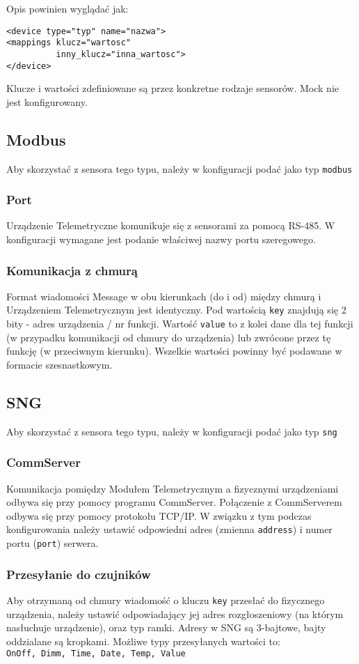 \documentclass[11pt]{article}
\begin{document}
Opis powinien wyglądać jak:
\begin{verbatim}
<device type="typ" name="nazwa">
<mappings klucz="wartosc"
          inny_klucz="inna_wartosc">
</device>
\end{verbatim}

Klucze i wartości zdefiniowane są przez konkretne rodzaje sensorów. Mock nie jest konfigurowany.


\subsection{Modbus}
Aby skorzystać z sensora tego typu, należy w konfiguracji podać jako typ \verb|modbus|
\subsubsection{Port}
Urządzenie Telemetryczne komunikuje się z sensorami za pomocą RS-485. W konfiguracji wymagane
jest podanie właściwej nazwy portu szeregowego.

\subsubsection{Komunikacja z chmurą}
Format wiadomości Message w obu kierunkach (do i od) między chmurą i Urządzeniem Telemetrycznym jest identyczny.
Pod wartością \verb|key| znajdują się 2 bity - adres urządzenia / nr funkcji. Wartość \verb|value| to z kolei dane
dla tej funkcji (w przypadku komunikacji od chmury do urządzenia) lub zwrócone przez tę funkcję (w przeciwnym kierunku).
Wszelkie wartości powinny być podawane w formacie szesnastkowym.


\subsection{SNG}
Aby skorzystać z sensora tego typu, należy w konfiguracji podać jako typ \verb|sng|
\subsubsection{CommServer}
Komunikacja pomiędzy Modułem Telemetrycznym a fizycznymi urządzeniami odbywa się przy pomocy
programu CommServer. Połączenie z CommServerem odbywa się przy pomocy protokołu TCP/IP.
W związku z tym podczas konfigurowania należy ustawić odpowiedni adres (zmienna \verb|address|)
i numer portu (\verb|port|) serwera.

\subsubsection{Przesyłanie do czujników}
Aby otrzymaną od chmury wiadomość o kluczu \verb|key| przesłać do fizycznego urządzenia,
należy ustawić odpowiadający jej adres rozgłoszeniowy (na którym nasłuchuje urządzenie), 
oraz typ ramki. Adresy w SNG są 3-bajtowe, bajty oddzialane są kropkami. 
Możliwe typy przesyłanych wartości to:\\
\verb|OnOff, Dimm, Time, Date, Temp, Value|
\end{document}
